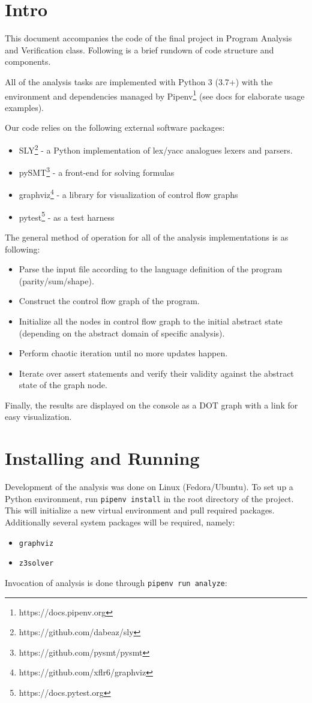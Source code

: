 \documentclass[12pt,a4paper]{article}
\begin{document}
	\section*{Intro}
	This document accompanies the code of the final project in Program Analysis and Verification class. Following is a brief rundown of code structure and components.
	
	All of the analysis tasks are implemented with Python 3 (3.7+) with the environment and dependencies managed by Pipenv\footnote{https://docs.pipenv.org} (see docs for elaborate usage examples).
	
	Our code relies on the following external software packages:
	\begin{itemize}
		\item SLY\footnote{https://github.com/dabeaz/sly} - a Python implementation of lex/yacc analogues lexers and parsers.
		\item pySMT\footnote{https://github.com/pysmt/pysmt} - a front-end for solving formulas
		\item graphviz\footnote{https://github.com/xflr6/graphviz} - a library for visualization of control flow graphs
		\item pytest\footnote{https://docs.pytest.org} - as a test harness
	\end{itemize}
The general method of operation for all of the analysis implementations is as following:
\begin{itemize}
	\item Parse the input file according to the language definition of the program (parity/sum/shape).
	\item Construct the control flow graph of the program.
	\item Initialize all the nodes in control flow graph to the initial abstract state (depending on the abstract domain of specific analysis).
	\item Perform chaotic iteration until no more updates happen.
	\item Iterate over assert statements and verify their validity against the abstract state of the graph node.
\end{itemize}
Finally, the results are displayed on the console as a DOT graph with a link for easy visualization.

\section*{Installing and Running}
Development of the analysis was done on Linux (Fedora/Ubuntu). To set up a Python environment, run \texttt{pipenv install} in the root directory of the project. This will initialize a new virtual environment and pull required packages. Additionally several system packages will be required, namely:
\begin{itemize}
	\item \texttt{graphviz}
	\item \texttt{z3solver}
\end{itemize}

Invocation of analysis is done through \texttt{pipenv run analyze}:



\end{document}
